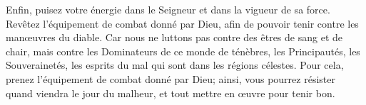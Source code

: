 Enfin, puisez votre énergie dans le Seigneur et dans la vigueur de sa force.
Revêtez l’équipement de combat donné par Dieu,
	afin de pouvoir tenir contre les manœuvres du diable.
Car nous ne luttons pas contre des êtres de sang et de chair,
	mais contre les Dominateurs de ce monde de ténèbres,
	les Principautés, les Souverainetés,
	les esprits du mal qui sont dans les régions célestes.
Pour cela, prenez l’équipement de combat donné par Dieu;
	ainsi, vous pourrez résister quand viendra le jour du malheur,
	et tout mettre en œuvre pour tenir bon.

